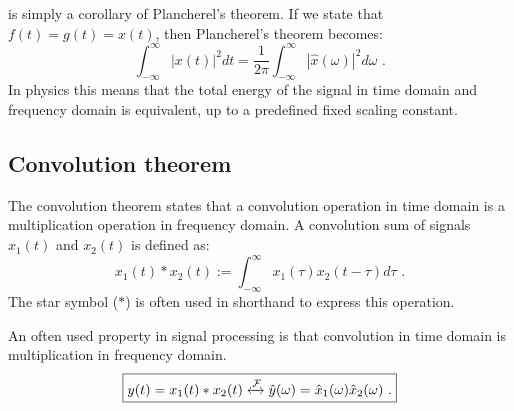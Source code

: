  is simply a corollary of Plancherel's theorem. 
If we state that $f(t)=g(t)=x(t)$, then Plancherel's theorem becomes:
\begin{equation}
    \boxed{
        \int_{-\infty}^{\infty} |x(t)|^2 dt = \frac{1}{2\pi} \int_{-\infty}^{\infty} | \hat{x}(\omega)|^2 d\omega\,\,.
    }
\end{equation}
In physics this means that the total energy of the signal in time domain and 
frequency domain is equivalent, up to a predefined fixed scaling constant.


\subsection{Convolution theorem}
The convolution theorem states that a convolution operation in time domain is a 
multiplication operation in frequency domain. A convolution sum of signals $x_1(t)$ and $x_2(t)$ is defined as:
\begin{equation}
    \boxed{
        x_1(t)*x_2(t) := \int_{-\infty}^{\infty} x_1(\tau) x_2(t-\tau)d\tau\,\,.
    }
\end{equation}
The star symbol ($*$) is often used in shorthand to express this operation.

An often used property in signal processing is that convolution in time domain 
is multiplication in frequency domain.
\begin{equation}
    \boxed{
        y(t) =
        x_1(t)*x_2(t) \xleftrightarrow{\mathcal{F}} \hat{y}(\omega)=\hat{x}_1(\omega)\hat{x}_2(\omega)\,\,.
    }
\end{equation}



